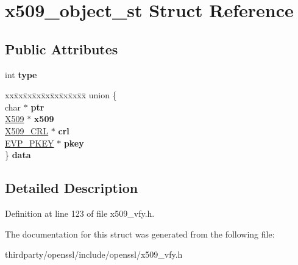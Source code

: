 \hypertarget{structx509__object__st}{}\section{x509\+\_\+object\+\_\+st Struct Reference}
\label{structx509__object__st}
\subsection*{Public Attributes}
\begin{DoxyCompactItemize}
\item 
\mbox{\label{structx509__object__st_a9a1693800fb57bf3d3e2f47d2f57ea60}} 
int {\bfseries type}
\item 
\mbox{\label{structx509__object__st_ace2b28b9a978fc83801f44a0c853b46e}} 
\begin{tabbing}
xx\=xx\=xx\=xx\=xx\=xx\=xx\=xx\=xx\=\kill
union \{\\
\>char $\ast$ {\bfseries ptr}\\
\>\hyperlink{structx509__st}{X509} $\ast$ {\bfseries x509}\\
\>\hyperlink{struct_x509__crl__st}{X509\_CRL} $\ast$ {\bfseries crl}\\
\>\hyperlink{structevp__pkey__st}{EVP\_PKEY} $\ast$ {\bfseries pkey}\\
\} {\bfseries data}\\

\end{tabbing}\end{DoxyCompactItemize}


\subsection{Detailed Description}


Definition at line 123 of file x509\+\_\+vfy.\+h.



The documentation for this struct was generated from the following file\+:\begin{DoxyCompactItemize}
\item 
thirdparty/openssl/include/openssl/x509\+\_\+vfy.\+h\end{DoxyCompactItemize}
